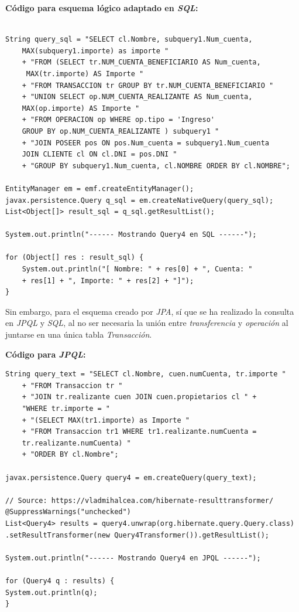 \documentclass[11pt,a4paper]{article}
\begin{document}
\textbf{Código para esquema lógico adaptado en \textit{SQL}:}
\begin{lstlisting}

String query_sql = "SELECT cl.Nombre, subquery1.Num_cuenta, 
	MAX(subquery1.importe) as importe "
	+ "FROM (SELECT tr.NUM_CUENTA_BENEFICIARIO AS Num_cuenta,
	 MAX(tr.importe) AS Importe "
	+ "FROM TRANSACCION tr GROUP BY tr.NUM_CUENTA_BENEFICIARIO "
	+ "UNION SELECT op.NUM_CUENTA_REALIZANTE AS Num_cuenta, 
	MAX(op.importe) AS Importe "
	+ "FROM OPERACION op WHERE op.tipo = 'Ingreso' 
	GROUP BY op.NUM_CUENTA_REALIZANTE ) subquery1 "
	+ "JOIN POSEER pos ON pos.Num_cuenta = subquery1.Num_cuenta 
	JOIN CLIENTE cl ON cl.DNI = pos.DNI "
	+ "GROUP BY subquery1.Num_cuenta, cl.NOMBRE ORDER BY cl.NOMBRE";

EntityManager em = emf.createEntityManager();
javax.persistence.Query q_sql = em.createNativeQuery(query_sql);
List<Object[]> result_sql = q_sql.getResultList();

System.out.println("------ Mostrando Query4 en SQL ------");

for (Object[] res : result_sql) {
	System.out.println("[ Nombre: " + res[0] + ", Cuenta: " 
	+ res[1] + ", Importe: " + res[2] + "]");
}
\end{lstlisting}
\bigbreak
Sin embargo, para el esquema creado por \textit{JPA}, sí que se ha realizado la consulta en \textit{JPQL} y \textit{SQL}, al no ser necesaria la unión entre \textit{transferencia} y \textit{operación} al juntarse en una única tabla \textit{Transacción}.

\bigbreak
\textbf{Código para \textit{JPQL}:}

\begin{lstlisting}
String query_text = "SELECT cl.Nombre, cuen.numCuenta, tr.importe " 
	+ "FROM Transaccion tr "
	+ "JOIN tr.realizante cuen JOIN cuen.propietarios cl " + 
	"WHERE tr.importe = "
	+ "(SELECT MAX(tr1.importe) as Importe "
	+ "FROM Transaccion tr1 WHERE tr1.realizante.numCuenta = 
	tr.realizante.numCuenta) "
	+ "ORDER BY cl.Nombre";

javax.persistence.Query query4 = em.createQuery(query_text);

// Source: https://vladmihalcea.com/hibernate-resulttransformer/
@SuppressWarnings("unchecked")
List<Query4> results = query4.unwrap(org.hibernate.query.Query.class)
.setResultTransformer(new Query4Transformer()).getResultList();

System.out.println("------ Mostrando Query4 en JPQL ------");

for (Query4 q : results) {
System.out.println(q);
}
\end{lstlisting}
\end{document}
